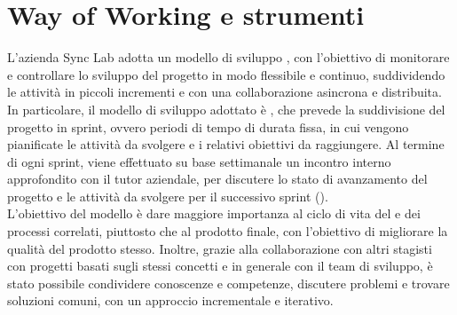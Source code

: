 \section{Way of Working e strumenti}\label{sec:way-of-working}
L'azienda Sync Lab adotta un modello di sviluppo , con l'obiettivo di monitorare e controllare lo sviluppo del progetto in modo flessibile e continuo, suddividendo le attività
in piccoli incrementi e con una collaborazione asincrona e distribuita. In particolare, il modello di sviluppo adottato è , che prevede la suddivisione del progetto in sprint,
ovvero periodi di tempo di durata fissa, in cui vengono pianificate le attività da svolgere e i relativi obiettivi da raggiungere. Al termine di ogni sprint, viene effettuato su base settimanale
un incontro interno approfondito con il tutor aziendale, per discutere lo stato di avanzamento del progetto e le attività da svolgere per il successivo sprint (\cite{site:scrum}). \\

L'obiettivo del modello è dare maggiore importanza al ciclo di vita del  e dei processi correlati, piuttosto che al prodotto finale, con l'obiettivo di migliorare la qualità del prodotto stesso.
Inoltre, grazie alla collaborazione con altri stagisti con progetti basati sugli stessi concetti e in generale con il team di sviluppo, è stato possibile condividere conoscenze e competenze,
discutere problemi e trovare soluzioni comuni, con un approccio incrementale e iterativo. \\

